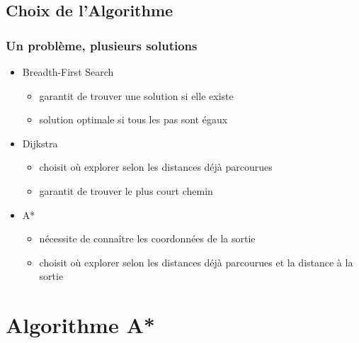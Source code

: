 \documentclass{beamer}
\begin{document}
\subsection{Choix de l'Algorithme}
\begin{frame}
  \frametitle{Un problème, plusieurs solutions}
  \begin{itemize}
  \item<1-> Breadth-First Search
    \begin{itemize}
    \item garantit de trouver une solution si elle existe
    \item solution optimale si tous les pas sont égaux
    \end{itemize}
  \item<2-> Dijkstra
    \begin{itemize}
    \item choisit où explorer selon les distances déjà parcourues
    \item garantit de trouver le plus court chemin
    \end{itemize}    
  \item<3-> A*
    \begin{itemize}
    \item nécessite de connaître les coordonnées de la sortie
    \item choisit où explorer selon les distances déjà parcourues et la distance
      à la sortie
    \end{itemize}
  \end{itemize}
\end{frame}

\section{Algorithme A*}
\end{document}
